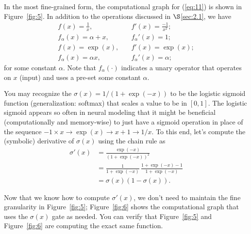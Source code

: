 In the most fine-grained form, the computational graph for (\ref{eq:11}) is shown in Figure~\ref{fig:5}. In addition to the operations discussed in $\S$\ref{sec:2.1}, we have
\begin{align*}
    f(x) = \frac{1}{x}, &\quad f'(x) = \frac{-1}{x^2}; \\
    f_\alpha(x) = \alpha + x, &\quad f_\alpha'(x) = 1; \\
    f(x) = \exp(x), &\quad f'(x) = \exp(x); \\
    f_\alpha(x) = \alpha x, &\quad f_\alpha'(x) = \alpha;
\end{align*}
for some constant $\alpha$. Note that $f_\alpha(\cdot)$ indicates a unary operator that operates on $x$ (input) and uses a pre-set some constant $\alpha$. 

You may recognize the $\sigma(x) = 1/(1+\exp(-x))$ to be the logistic sigmoid function (generalization: softmax) that scales a value to be in $[0, 1]$. The logistic sigmoid appears so often in neural modeling that it might be beneficial (computationally and memory-wise) to just have a sigmoid operation in place of the sequence $-1 \times x \rightarrow \exp(x) \rightarrow x + 1 \rightarrow 1/x$. To this end, let's compute the (symbolic) derivative of $\sigma(x)$ using the chain rule as
\begin{align*}
\sigma'(x) &= \frac{\exp(-x)}{(1 + \exp(-x))^2} \\
&= \frac{1}{1 + \exp(-x)}\,\frac{1 + \exp(-x) - 1}{1 + \exp(-x)} \\
&= \sigma(x) (1 - \sigma(x)).
\end{align*}

Now that we know how to compute $\sigma'(x)$, we don't need to maintain the fine granularity in Figure~\ref{fig:5}; Figure~\ref{fig:6} shows the computational graph that uses the $\sigma(x)$ gate as needed. You can verify that Figure~\ref{fig:5} and Figure~\ref{fig:6} are computing the exact same function.


